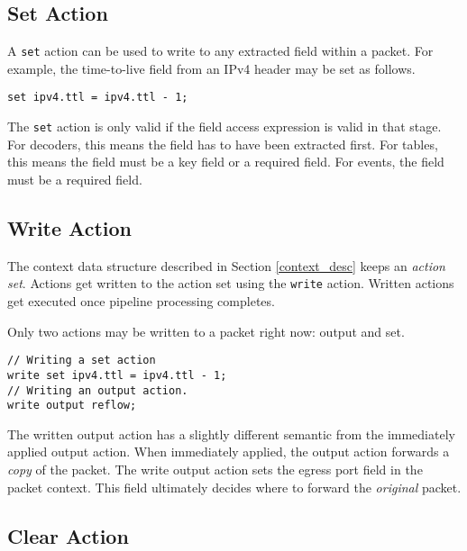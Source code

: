 \subsection{Set Action} \label{tut:set_action}

A \texttt{set} action can be used to write to any extracted field within a
packet. For example, the time-to-live field from an IPv4 header may be set as
follows.

\begin{codepage}
\begin{lstlisting}
set ipv4.ttl = ipv4.ttl - 1;
\end{lstlisting}
\end{codepage}

The \texttt{set} action is only valid if the field access expression is valid in
that stage. For decoders, this means the field has to have been extracted first.
For tables, this means the field must be a key field or a required field. For
events, the field must be a required field.

\subsection{Write Action} \label{tut:write_action}

The context data structure described in Section \ref{context_desc} keeps an
\textit{action set}. Actions get written to the action set using the
\texttt{write} action. Written actions get executed once pipeline processing
completes.

Only two actions may be written to a packet right now: output and set.

\begin{lstlisting}
// Writing a set action
write set ipv4.ttl = ipv4.ttl - 1;
// Writing an output action.
write output reflow;
\end{lstlisting}

The written output action has a slightly different semantic from the immediately
applied output action. When immediately applied, the output action forwards a
\textit{copy} of the packet. The write output action sets the egress port field
in the packet context. This field ultimately decides where to forward the
\textit{original} packet.

\subsection{Clear Action} \label{tut:clear_action}

